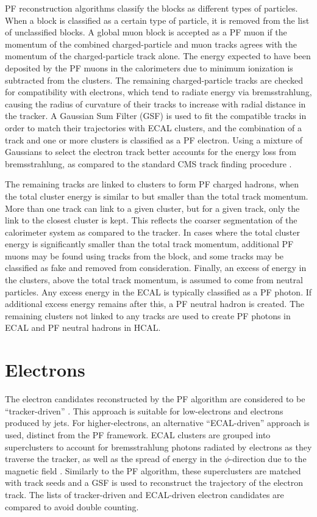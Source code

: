 \documentclass[12pt]{thesis}  %
\begin{document}
PF reconstruction algorithms classify the blocks as different types of particles. When a block is classified as a certain type of particle, it is removed from the list of unclassified blocks. A global muon block is accepted as a PF muon if the momentum of the combined charged-particle and muon tracks agrees with the momentum of the charged-particle track alone. The energy expected to have been deposited by the PF muons in the calorimeters due to minimum ionization is subtracted from the clusters. The remaining charged-particle tracks are checked for compatibility with electrons, which tend to radiate energy via bremsstrahlung, causing the radius of curvature of their tracks to increase with radial distance in the tracker. A Gaussian Sum Filter (GSF) is used to fit the compatible tracks in order to match their trajectories with ECAL clusters, and the combination of a track and one or more clusters is classified as a PF electron. Using a mixture of Gaussians to select the electron track better accounts for the energy loss from bremsstrahlung, as compared to the standard CMS track finding procedure \cite{ElectronGSF}.

The remaining tracks are linked to clusters to form PF charged hadrons, when the total cluster energy is similar to but smaller than the total track momentum. More than one track can link to a given cluster, but for a given track, only the link to the closest cluster is kept. This reflects the coarser segmentation of the calorimeter system as compared to the tracker. In cases where the total cluster energy is significantly smaller than the total track momentum, additional PF muons may be found using tracks from the block, and some tracks may be classified as fake and removed from consideration. Finally, an excess of energy in the clusters, above the total track momentum, is assumed to come from neutral particles. Any excess energy in the ECAL is typically classified as a PF photon. If additional excess energy remains after this, a PF neutral hadron is created. The remaining clusters not linked to any tracks are used to create PF photons in ECAL and PF neutral hadrons in HCAL.

\section{Electrons
\label{sec:ele-reco}}

The electron candidates reconstructed by the PF algorithm are considered to be ``tracker-driven'' \cite{CMS-PAS-EGM-10-004}. This approach is suitable for low-\pt electrons and electrons produced by jets. For higher-\pt electrons, an alternative ``ECAL-driven'' approach is used, distinct from the PF framework. ECAL clusters are grouped into superclusters to account for bremsstrahlung photons radiated by electrons as they traverse the tracker, as well as the spread of energy in the $\phi$-direction due to the magnetic field \cite{ElectronReco}. Similarly to the PF algorithm, these superclusters are matched with track seeds and a GSF is used to reconstruct the trajectory of the electron track. The lists of tracker-driven and ECAL-driven electron candidates are compared to avoid double counting.
\end{document}
